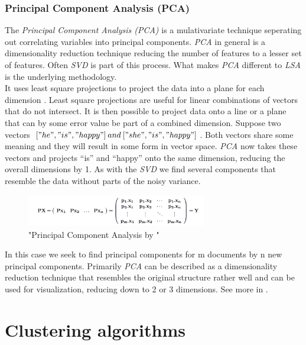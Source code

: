     \subsubsection{Principal Component Analysis (PCA)}
    The \emph{Principal Component Analysis (PCA)} is a mulativariate technique seperating out correlating variables into principal components. \emph{PCA} in general is a dimensionality reduction technique reducing the number of features to a lesser set of features. Often \emph{SVD} is part of this process. What makes \emph{PCA} different to \emph{LSA} is the underlying methodology.\\
    It uses least square projections to project the data into a plane for each dimension \cite{Strang2009}. Least square projections are useful for linear combinations of vectors that do not intersect. It is then possible to project data onto a line or a plane that can by some error value be part of a combined dimension. Suppose two vectors $["he", "is", "happy"]\:and\:["she", "is", "happy"]$. Both vectors share some meaning and they will result in some form in vector space. \emph{PCA} now takes these vectors and projects ``is'' and ``happy'' onto the same dimension, reducing the overall dimensions by 1. As with the \emph{SVD} we find several components that resemble the data without parts of the noisy variance.

    \begin{figure}[h!]
      \centering
        \includegraphics[width=0.7\textwidth]{PCA.png}
        \caption{"Principal Component Analysis by \cite{PCA2009}"}
        \label{pca}
    \end{figure}

    In this case we seek to find principal components for m documents by n new principal components. Primarily \emph{PCA} can be described as a dimensionality reduction technique that resembles the original structure rather well and can be used for visualization, reducing down to 2 or 3 dimensions. See more in \cite{PCA2009}.


\section{Clustering algorithms}
  
